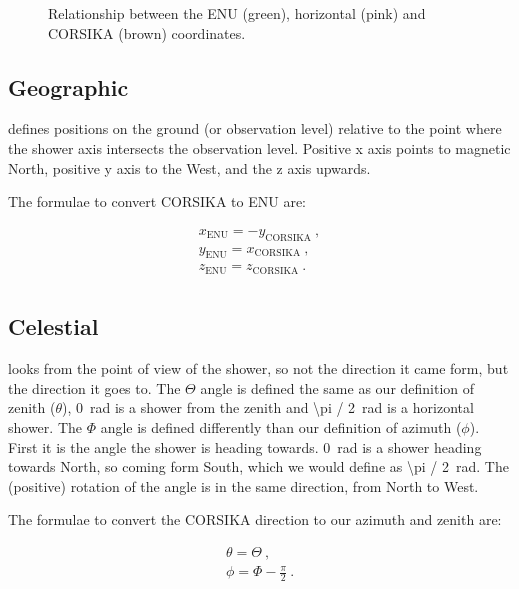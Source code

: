 \begin{figure}
    \centering
    
    \caption{Relationship between the ENU (green), horizontal (pink)
             and CORSIKA (brown) coordinates.}
    \label{fig:enu_corsika}
\end{figure}


\subsection{Geographic}

\corsika defines positions on the ground (or observation level) relative
to the point where the shower axis intersects the observation level.
Positive x axis points to magnetic North, positive y axis to the West,
and the z axis upwards.

The formulae to convert CORSIKA to ENU are:

\begin{equation}
    \begin{array}{l}
        x_{\mathrm{ENU}} = -y_{\mathrm{CORSIKA}} \ , \\
        y_{\mathrm{ENU}} = x_{\mathrm{CORSIKA}} \ , \\
        z_{\mathrm{ENU}} = z_{\mathrm{CORSIKA}} \ . \\
    \end{array}
\end{equation}


\subsection{Celestial}

\corsika looks from the point of view of the shower, so not the
direction it came form, but the direction it goes to. The $\Theta$ angle
is defined the same as our definition of zenith ($\theta$),
\SI{0}{\radian} is a shower from the zenith and \SI{\pi / 2}{\radian} is
a horizontal shower. The $\Phi$ angle is defined differently than our
definition of azimuth ($\phi$). First it is the angle the shower is heading
towards. \SI{0}{\radian} is a shower heading towards North, so coming
form South, which we would define as \SI{\pi / 2}{\radian}. The
(positive) rotation of the angle is in the same direction, from North to
West.

The formulae to convert the CORSIKA direction to our azimuth and zenith are:

\begin{equation}
    \begin{array}{l}
        \theta = \Theta \ , \\
        \phi = \Phi - \frac{\pi}{2} \ . \\
    \end{array}
\end{equation}


